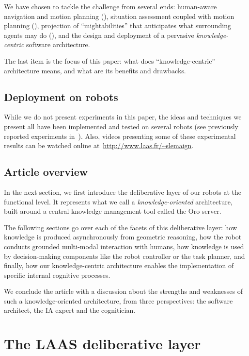 \documentclass[letterpaper, 10 pt, conference]{ieeeconf}  %
\begin{document}
We have chosen to tackle the challenge from several ends: human-aware
navigation and motion planning (\cite{Mainprice2011}), situation assessment
coupled with motion planning (\cite{Mainprice2012}), projection of
``mightabilities'' that anticipates what surrounding agents may do
(\cite{Pandey2011}), and the design and deployment of a pervasive
\emph{knowledge-centric} software architecture.

The last item is the focus of this paper: what does ``knowledge-centric''
architecture means, and what are its benefits and drawbacks.

\subsection{Deployment on robots}

While we do not present experiments in this paper, the ideas and techniques we
present all have been implemented and tested on several robots (see previously
reported experiments in~\cite{Lemaignan2010, Ros2010b, Lemaignan2011a,
Warnier2012a}). Also, videos presenting some of these experimental results can
be watched online at~\url{http://www.laas.fr/~slemaign}.

\subsection{Article overview}

In the next section, we first introduce the deliberative layer of our robots at
the functional level. It represents what we call a \emph{knowledge-oriented}
architecture, built around a central knowledge management tool called the {\sc
Oro} server.

The following sections go over each of the facets of this deliberative layer:
how knowledge is produced asynchronously from geometric reasoning, how the
robot conducts grounded multi-modal interaction with humans, how knowledge is
used by decision-making components like the robot controller or the task
planner, and finally, how our knowledge-centric architecture enables the
implementation of specific internal cognitive processes.

We conclude the article with a discussion about the strengths and weaknesses of
such a knowledge-oriented architecture, from three perspectives: the software
architect, the IA expert and the cognitician.


\section{The LAAS deliberative layer}
\end{document}
